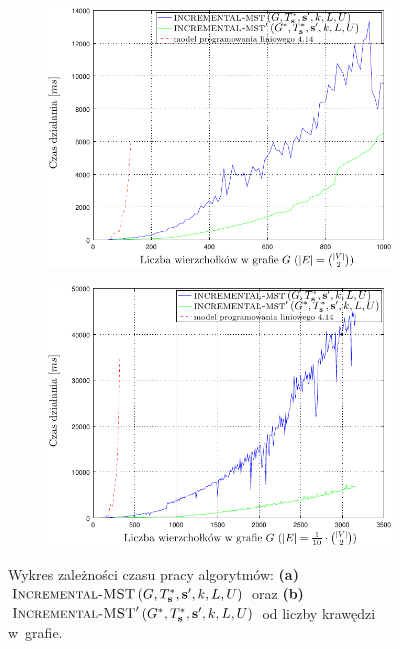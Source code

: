 \begin{figure}[!htbp]
	\renewcommand\figurename{Wykres}
	\null\hfill
	\begin{subfigure}[b]{0.45\textwidth}
		\includegraphics[width=\textwidth]{Chapter_VI/IMST1-example/IMST1_psfrag}
		\caption{}
		\label{fig:imst1:a}
	\end{subfigure}
	\hfill
	\begin{subfigure}[b]{0.45\textwidth}
		\includegraphics[width=\textwidth]{Chapter_VI/IMST3-example/IMST3_psfrag}
		\caption{}
		\label{fig:imst1:c}
	\end{subfigure}
	\hfill\null
	\caption{
		Wykres zależności czasu pracy algorytmów:
		\textbf{(a)}~$\textsc{Incremental-MST} \left( G, T^{\ast}_{\textbf{s}}, \textbf{s}^{\prime}, k, L, U \right)$ oraz \textbf{(b)}~$\textsc{Incremental-MST}^{\prime} \left( G^{\ast}, T^{\ast}_{\textbf{s}}, \textbf{s}^{\prime}, k, L, U \right)$ od liczby krawędzi w~grafie.
	}
	\label{fig:imst1}
\end{figure}


